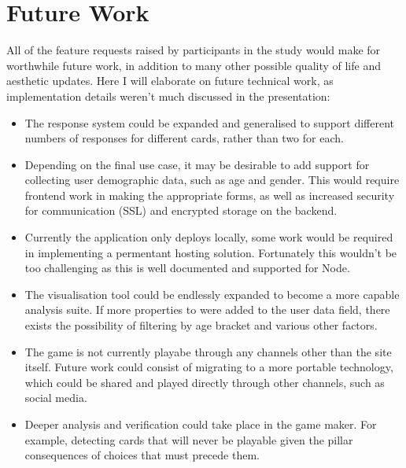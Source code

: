 \section{Future Work}
All of the feature requests raised by participants in the study would make for worthwhile future work, in addition to many other possible quality of life and aesthetic updates. Here I will elaborate on future technical work, as implementation details weren't much discussed in the presentation:

\begin{itemize}
    \item The response system could be expanded and generalised to support different numbers of responses for different cards, rather than two for each.
    \item Depending on the final use case, it may be desirable to add support for collecting user demographic data, such as age and gender. This would require frontend work in making the appropriate forms, as well as increased security for communication (SSL) and encrypted storage on the backend.
    \item Currently the application only deploys locally, some work would be required in implementing a permentant hosting solution. Fortunately this wouldn't be too challenging as this is well documented and supported for Node.
    \item The visualisation tool could be endlessly expanded to become a more capable analysis suite. If more properties to were added to the user data field, there exists the possibility of filtering by age bracket and various other factors.
    \item The game is not currently playabe through any channels other than the site itself. Future work could consist of migrating to a more portable technology, which could be shared and played directly through other channels, such as social media.
    \item Deeper analysis and verification could take place in the game maker. For example, detecting cards that will never be playable given the pillar consequences of choices that must precede them.
\end{itemize}